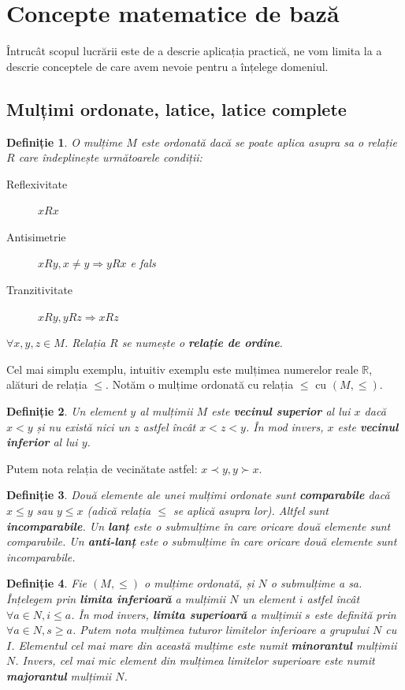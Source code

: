 \documentclass[12pt, a4paper, twoside, romanian]{teza-upb}
\newtheorem{defn}{Definiție}
\begin{document}
  \section{Concepte matematice de bază}
    Întrucât scopul lucrării este de a descrie aplicația practică, ne vom limita la a descrie conceptele de care avem nevoie pentru a înțelege domeniul.
    \subsection{Mulțimi ordonate, latice, latice complete}
    \begin{defn}
      O mulțime $M$ este ordonată dacă se poate aplica asupra sa o relație $R$ care îndeplinește următoarele condiții:
      \begin{description}
        \item [Reflexivitate] $xRx$
        \item [Antisimetrie] $xRy, x \neq y \Rightarrow yRx$ e fals
        \item [Tranzitivitate] $xRy, yRz \Rightarrow xRz$
      \end{description}
      $\forall x, y,z \in M$. Relația $R$ se numește o \textbf{relație de ordine}.
    \end{defn}

    Cel mai simplu exemplu, intuitiv exemplu este mulțimea numerelor reale $ \mathbb{R}$, alături de relația $\le$. Notăm o mulțime ordonată cu relația $\le$ cu $(M, \le)$.

    \begin{defn}
      Un element $y$ al mulțimii $M$ este \textbf{vecinul superior} al lui $x$ dacă $x < y$ și nu există nici un $z$ astfel încât $x < z < y$. În mod invers, $x$ este \textbf{vecinul inferior} al lui $y$.
    \end{defn}

    Putem nota relația de vecinătate astfel: $x \prec y, y \succ x$.

    \begin{defn}
      Două elemente ale unei mulțimi ordonate sunt \textbf{comparabile} dacă $x \le y$ sau $y \le x$ (adică relația $\le$ se aplică asupra lor). Altfel sunt \textbf{incomparabile}. Un \textbf{lanț} este o submulțime în care oricare două elemente sunt comparabile. Un \textbf{anti-lanț} este o submulțime în care oricare două elemente sunt incomparabile.
    \end{defn}

    \begin{defn}
      Fie $(M, \le)$ o mulțime ordonată, și $N$ o submulțime a sa. Înțelegem prin \textbf{limita inferioară} a mulțimii $N$ un element $i$ astfel încât $\forall a \in N, i \le a$. În mod invers, \textbf{limita superioară} a mulțimii $s$ este definită prin $\forall a \in N, s \ge a$.
      Putem nota mulțimea tuturor limitelor inferioare a grupului $N$ cu $I$. Elementul cel mai mare din această mulțime este numit \textbf{minorantul} mulțimii $N$. Invers, cel mai mic element din mulțimea limitelor superioare este numit \textbf{majorantul} mulțimii $N$.
    \end{defn}
\end{document}
